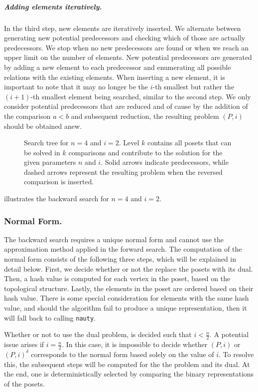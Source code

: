 \documentclass[a4paper,UKenglish,cleveref, autoref, thm-restate]{lipics-v2021}
\newcommand{\dual}[1]{{#1}^{\delta}}
\begin{document}
\subparagraph{Adding elements iteratively.}
In the third step, new elements are iteratively inserted.
We alternate between generating new potential predecessors and checking which of those are actually predecessors.
We stop when no new predecessors are found or when we reach an upper limit on the number of elements.
New potential predecessors are generated by adding a new element to each predecessor and enumerating all possible relations with the existing elements.
When inserting a new element, it is important to note that it may no longer be the $i$-th smallest but rather the $(i + 1)$-th smallest element being searched, similar to the second step.
We only consider potential predecessors that are reduced and of cause by the addition of the comparison $a < b$ and subsequent reduction, the resulting problem $(P, i)$ should be obtained anew.

\begin{figure}[!b]
  \centering
  
  \caption{Search tree for $n = 4$ and $i = 2$.
    Level $k$ contains all posets that can be solved in $k$ comparisons and contribute to the solution for the given parameters $n$ and $i$.
    Solid arrows indicate predecessors, while dashed arrows represent the resulting problem when the reversed comparison is inserted.}
  \label{fig:backward-search-tree}
\end{figure}

 illustrates the backward search for $n = 4$ and $i = 2$.

\subsubsection{Normal Form.} \label{sec:backward:normal_form}
The backward search requires a unique normal form and cannot use the approximation method applied in the forward search.
The computation of the normal form consists of the following three steps, which will be explained in detail below.
First, we decide whether or not the replace the posets with its dual.
Then, a hash value is computed for each vertex in the poset, based on the topological structure.
Lastly, the elements in the poset are ordered based on their hash value.
There is some special consideration for elements with the same hash value, and should the algorithm fail to produce a unique representation, then it will fall back to calling \texttt{nauty}.

Whether or not to use the dual problem, is decided such that $i < \tfrac{n}{2}$.
A potential issue arises if $i = \tfrac{n}{2}$.
In this case, it is impossible to decide whether $(P, i)$ or $\dual{(P, i)}$ corresponds to the normal form based solely on the value of $i$.
To resolve this, the subsequent steps will be computed for the the problem and its dual.
At the end, one is deterministically selected by comparing the binary representations of the posets.
\end{document}
